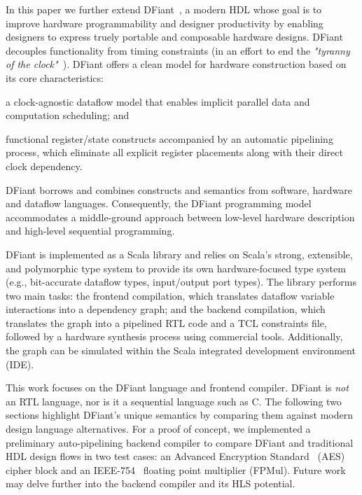 In this paper we further extend DFiant~\cite{Port2017}, a modern HDL whose goal is to improve hardware programmability and designer productivity by enabling designers to express truely portable and composable hardware designs.
DFiant decouples functionality from timing constraints (in an effort to end the \emph{"tyranny of the clock"}~\cite{Sutherland2012}). DFiant offers a clean model for hardware construction based on its core characteristics:
\begin{enumerate*}[label=(\roman*)]
\item
  a clock-agnostic dataflow model that enables implicit parallel data and computation scheduling; and
\item
  functional register/state constructs accompanied by an automatic pipelining process, which eliminate all explicit register placements along with their direct clock dependency.
\end{enumerate*} DFiant borrows and combines constructs and semantics from software, hardware and dataflow languages. Consequently, the DFiant programming model accommodates a middle-ground approach between low-level hardware description and high-level sequential programming. 

DFiant is implemented as a Scala library and relies on Scala's strong, extensible, and polymorphic type system to provide its own hardware-focused type system (e.g., bit-accurate dataflow types, input/output port types). The library performs two main tasks: the frontend compilation, which translates dataflow variable interactions into a dependency graph; and the backend compilation, which translates the graph into a pipelined RTL code and a TCL constraints file, followed by a hardware synthesis process using commercial tools. Additionally, the graph can be simulated within the Scala integrated development environment (IDE). 

This work focuses on the DFiant language and frontend compiler. DFiant is \emph{not} an RTL language, nor is it a sequential language such as C. The following two sections highlight DFiant's unique semantics by comparing them against modern design language alternatives. For a proof of concept, we implemented a preliminary auto-pipelining backend compiler to compare DFiant and traditional HDL design flows in two test cases: an Advanced Encryption Standard~\cite{pub2001197} (AES) cipher block and an IEEE-754~\cite{IEEE2008} floating point multiplier (FPMul). Future work may delve further into the backend compiler and its HLS potential.


